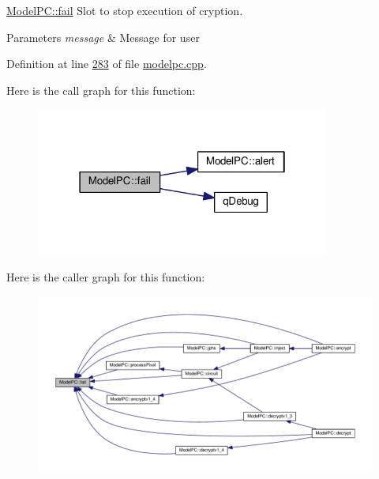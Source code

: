 \hyperlink{class_model_p_c_a47464b59b7e37fcee25e55475708aabd}{Model\+P\+C\+::fail} Slot to stop execution of cryption. 


\begin{DoxyParams}{Parameters}
{\em message} & Message for user \\
\hline
\end{DoxyParams}


Definition at line \hyperlink{modelpc_8cpp_source_l00283}{283} of file \hyperlink{modelpc_8cpp_source}{modelpc.\+cpp}.



Here is the call graph for this function\+:
\nopagebreak
\begin{figure}[H]
\begin{center}
\leavevmode
\includegraphics[width=274pt]{class_model_p_c_a47464b59b7e37fcee25e55475708aabd_cgraph}
\end{center}
\end{figure}




Here is the caller graph for this function\+:
\nopagebreak
\begin{figure}[H]
\begin{center}
\leavevmode
\includegraphics[width=350pt]{class_model_p_c_a47464b59b7e37fcee25e55475708aabd_icgraph}
\end{center}
\end{figure}


